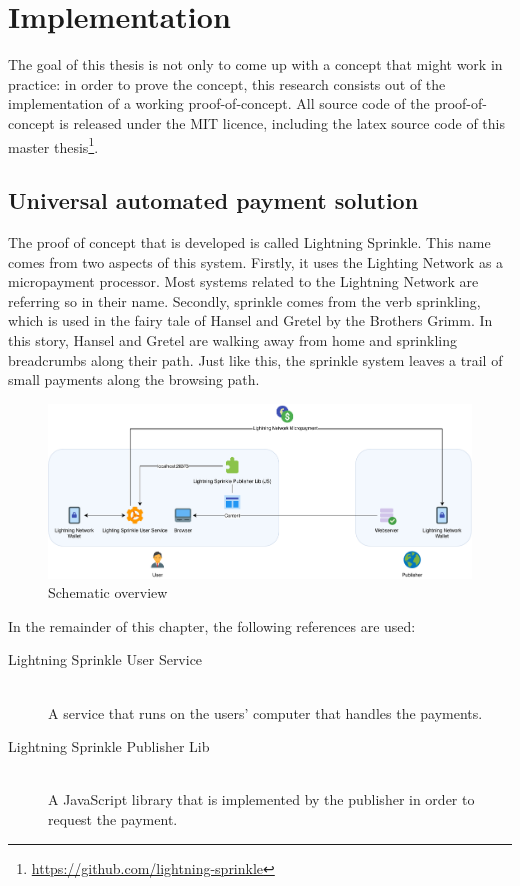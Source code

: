 \chapter{Implementation}
\label{cha:implementation}

The goal of this thesis is not only to come up with a concept that might work in practice: in order to prove the concept, this research consists out of the implementation of a working proof-of-concept. All source code of the proof-of-concept is released under the MIT licence, including the latex source code of this master thesis\footnote{\url{https://github.com/lightning-sprinkle}}.

\section{Universal automated payment solution}
The proof of concept that is developed is called Lightning Sprinkle. This name comes from two aspects of this system. Firstly, it uses the Lighting Network as a micropayment processor. Most systems related to the Lightning Network are referring so in their name. Secondly, sprinkle comes from the verb sprinkling, which is used in the fairy tale of Hansel and Gretel by the Brothers Grimm. In this story, Hansel and Gretel are walking away from home and sprinkling breadcrumbs along their path. Just like this, the sprinkle system leaves a trail of small payments along the browsing path.
\begin{figure}[h!]
  \includegraphics[width=\textwidth]{images/implementation.pdf}
  \caption{Schematic overview}
\end{figure}
In the remainder of this chapter, the following references are used:

\begin{description}
  \item[Lightning Sprinkle User Service] \hfill \\ A service that runs on the users' computer that handles the payments.
  \item[Lightning Sprinkle Publisher Lib] \hfill \\ A JavaScript library that is implemented by the publisher in order to request the payment.
\end{description} 

